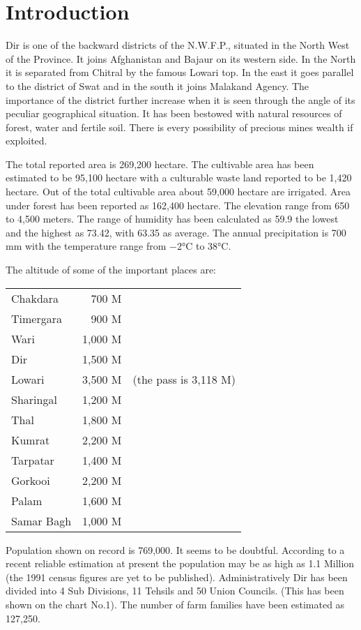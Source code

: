 \documentclass[twoside,openright]{book}
\begin{document}
\section{Introduction}

Dir is one of the backward districts of the N.W.F.P., situated in the North West
of the Province. It joins Afghanistan and Bajaur on its western side. In the
North it is separated from Chitral by the famous Lowari top. In the east it goes
parallel to the district of Swat and in the south it joins Malakand Agency. The
importance of the district further increase when it is seen through the angle of
its peculiar geographical situation. It has been bestowed with natural resources
of forest, water and fertile soil. There is every possibility of precious mines
wealth if exploited.

The total reported area is 269,200 hectare. The cultivable
area has been estimated to be 95,100 hectare with a culturable
waste land reported to be 1,420 hectare. Out of the total
cultivable area about 59,000 hectare are irrigated. Area under
forest has been reported as 162,400 hectare. The elevation range
from 650 to 4,500 meters. The range of humidity has been
calculated as 59.9 the lowest and the highest as 73.42, with 63.35
as average. The annual precipitation is 700 mm with the
temperature range from $-2$°C to 38°C.

The altitude of some of the important places are:

\begin{center}
\begin{tabular}{ l r l }
 Chakdara & 700 M &  \\
 Timergara & 900 M &  \\
 Wari & 1,000 M & \\
 Dir & 1,500 M & \\
 Lowari & 3,500 M & (the pass is 3,118 M) \\
 Sharingal & 1,200 M & \\
 Thal & 1,800 M & \\
 Kumrat & 2,200 M & \\
 Tarpatar & 1,400 M & \\
 Gorkooi & 2,200 M & \\
 Palam & 1,600 M & \\
 Samar Bagh & 1,000 M & \\
\end{tabular}
\end{center}

Population shown on record is 769,000. It seems to be doubtful. According to a
recent reliable estimation at present the population may be as high as 1.1
Million (the 1991 census figures are yet to be published). Administratively Dir
has been divided into 4 Sub Divisions, 11 Tehsils and 50 Union Councils. (This
has been shown on the chart No.1). The number of farm families have been
estimated as 127,250.
\end{document}
